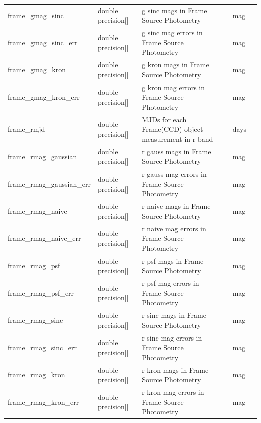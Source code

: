 \documentclass[12pt]{article}
\begin{document}
\begin{table}[thbp]
\begin{center}
{\begin{tabular}{llllll}
frame\_gmag\_sinc & double precision[] & g sinc mags in Frame Source Photometry          &                        & mag            &   \\
frame\_gmag\_sinc\_err & double precision[] & g sinc mag errors in Frame Source Photometry          &                        & mag            &   \\
frame\_gmag\_kron & double precision[] & g kron mags in Frame Source Photometry          &                        & mag            &   \\
frame\_gmag\_kron\_err & double precision[] & g kron mag errors in Frame Source Photometry          &                        & mag            &   \\
frame\_rmjd & double precision[] & MJDs for each Frame(CCD) object measurement in r band     &                        & days            &   \\
frame\_rmag\_gaussian & double precision[] & r gauss mags in Frame Source Photometry          &                        & mag            &   \\
frame\_rmag\_gaussian\_err & double precision[] & r gauss mag errors in Frame Source Photometry          &                        & mag            &   \\
frame\_rmag\_naive & double precision[] & r naive mags in Frame Source Photometry          &                        & mag            &   \\
frame\_rmag\_naive\_err & double precision[] & r naive mag errors in Frame Source Photometry          &                        & mag            &   \\
frame\_rmag\_psf & double precision[] & r psf mags in Frame Source Photometry          &                        & mag            &   \\
frame\_rmag\_psf\_err & double precision[] & r psf mag errors in Frame Source Photometry          &                        & mag            &   \\
frame\_rmag\_sinc & double precision[] & r sinc mags in Frame Source Photometry          &                        & mag            &   \\
frame\_rmag\_sinc\_err & double precision[] & r sinc mag errors in Frame Source Photometry          &                        & mag            &   \\
frame\_rmag\_kron & double precision[] & r kron mags in Frame Source Photometry          &                        & mag            &   \\
frame\_rmag\_kron\_err & double precision[] & r kron mag errors in Frame Source Photometry          &                        & mag            &   \\

\end{tabular}}
\end{center}
\end{table}
\end{document}
